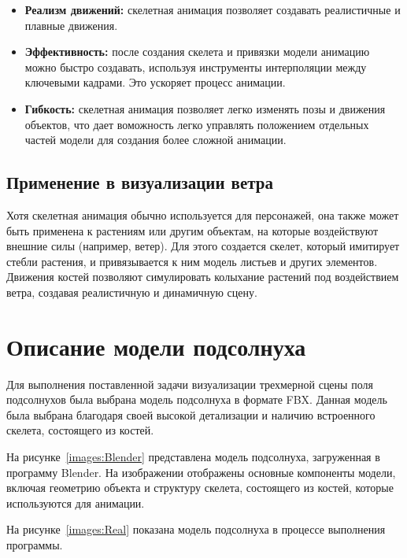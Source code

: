 \begin{itemize}
    \item \textbf{Реализм движений:} скелетная анимация позволяет создавать реалистичные и плавные движения.
    
    \item \textbf{Эффективность:} после создания скелета и привязки модели анимацию можно быстро создавать, используя инструменты интерполяции между ключевыми кадрами. Это ускоряет процесс анимации.
    
    \item \textbf{Гибкость:} скелетная анимация позволяет легко изменять позы и движения объектов, что дает воможность легко управлять положением отдельных частей модели для создания более сложной анимации.
\end{itemize}

\subsection{Применение в визуализации ветра}

Хотя скелетная анимация обычно используется для персонажей, она также может быть применена к растениям или другим объектам, на которые воздействуют внешние силы (например, ветер). Для этого создается скелет, который имитирует стебли растения, и привязывается к ним модель листьев и других элементов. Движения костей позволяют симулировать колыхание растений под воздействием ветра, создавая реалистичную и динамичную сцену.


\section{Описание модели подсолнуха}
Для выполнения поставленной задачи визуализации трехмерной сцены поля подсолнухов была выбрана модель подсолнуха в формате FBX. Данная модель была выбрана благодаря своей высокой детализации и наличию встроенного скелета, состоящего из костей.

 На рисунке~\ref{images:Blender} представлена модель подсолнуха, загруженная в программу Blender. На изображении отображены основные компоненты модели, включая геометрию объекта и структуру скелета, состоящего из костей, которые используются для анимации.

 На рисунке~\ref{images:Real} показана модель подсолнуха в процессе выполнения программы.


